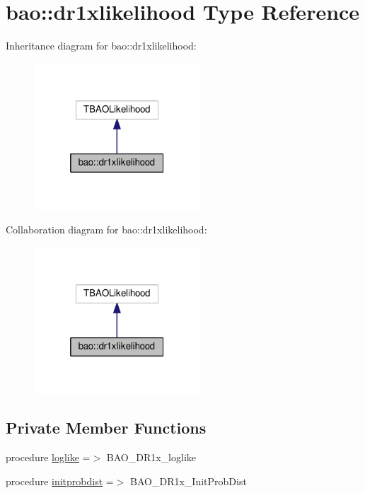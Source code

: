 \hypertarget{structbao_1_1dr1xlikelihood}{}\section{bao\+:\+:dr1xlikelihood Type Reference}
\label{structbao_1_1dr1xlikelihood}


Inheritance diagram for bao\+:\+:dr1xlikelihood\+:
\nopagebreak
\begin{figure}[H]
\begin{center}
\leavevmode
\includegraphics[width=176pt]{structbao_1_1dr1xlikelihood__inherit__graph}
\end{center}
\end{figure}


Collaboration diagram for bao\+:\+:dr1xlikelihood\+:
\nopagebreak
\begin{figure}[H]
\begin{center}
\leavevmode
\includegraphics[width=176pt]{structbao_1_1dr1xlikelihood__coll__graph}
\end{center}
\end{figure}
\subsection*{Private Member Functions}
\begin{DoxyCompactItemize}
\item 
procedure \mbox{\hyperlink{structbao_1_1dr1xlikelihood_a8a778cdb04d0bc93e13bdac9b2bbc84e}{loglike}} =$>$ B\+A\+O\+\_\+\+D\+R1x\+\_\+loglike
\item 
procedure \mbox{\hyperlink{structbao_1_1dr1xlikelihood_a4f410a1bd4608d3383d278b1dd53e2c0}{initprobdist}} =$>$ B\+A\+O\+\_\+\+D\+R1x\+\_\+\+Init\+Prob\+Dist
\end{DoxyCompactItemize}
